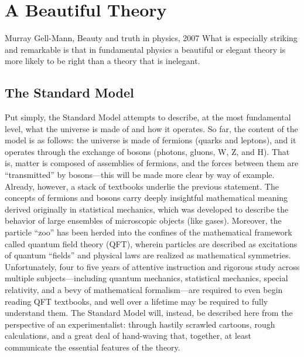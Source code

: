 \chapter{A Beautiful Theory}
\begin{aquote}{Murray Gell-Mann, Beauty and truth in physics, 2007}
    What is especially striking and remarkable is that in fundamental physics 
    a beautiful or elegant theory is more likely to be right 
    than a theory that is inelegant.
\end{aquote}
\section{The Standard Model}
Put simply, the Standard Model attempts to describe, at the most fundamental level, what the universe is made of and how it operates. 
So far, the content of the model is as follows: the universe is made of fermions (quarks and leptons), and it operates through the exchange of bosons (photons, gluons, W, Z, and H). 
That is, matter\footnotemark{} is composed of assemblies of fermions, and the forces between them are ``transmitted'' by bosons---this will be made more clear by way of example. 
Already, however, a stack of textbooks underlie the previous statement. 
The concepts of fermions and bosons carry deeply insightful mathematical meaning derived originally in statistical mechanics, which was developed to describe the behavior of large ensembles of microscopic objects (like gases). 
Moreover, the particle ``zoo'' has been herded into the confines of the mathematical framework called quantum field theory (QFT), wherein particles are described as excitations of quantum ``fields'' and physical laws are realized as mathematical symmetries. 
Unfortunately, four to five years of attentive instruction and rigorous study across multiple subjects---including quantum mechanics, statistical mechanics, special relativity, and a bevy of mathematical formalism---are required to even begin reading QFT textbooks, and well over a lifetime may be required to fully understand them. 
The Standard Model will, instead, be described here from the perspective of an experimentalist: through hastily scrawled cartoons, rough calculations, and a great deal of hand-waving that, together, at least communicate the essential features of the theory. 

